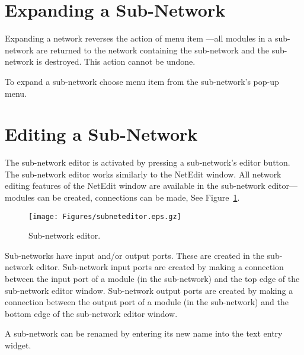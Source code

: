 \section{Expanding a Sub-Network}
\label{sec:expsubnet}

Expanding a network reverses the action of menu item ---all modules in a sub-network are returned to the
network containing the sub-network and the sub-network is destroyed.
This action cannot be undone.

To expand a sub-network choose menu item 
from the sub-network's pop-up menu.

\section{Editing a Sub-Network}
\label{sec:editsubnet}

\newcommand{\subneteditorfig}{%
  \centerline{\texttt{[image: Figures/subneteditor.eps.gz]}}
}
\begin{htmlonly}
  \newcommand{\subneteditorfig}{%
    \htmladdimg[alt="Sub-net editor"]{../Figures/subneteditor.gif}
  }
\end{htmlonly}

The sub-network editor is activated by pressing a sub-network's editor
button.  The sub-network editor works similarly to the NetEdit window.
All network editing features of the NetEdit window are available in
the sub-network editor---modules can be created, connections can be
made, \etc{} See Figure~\ref{fig:subneteditor}.

\begin{figure}[htb]
  \centering
  \begin{makeimage} \end{makeimage}
  \subneteditorfig
  \caption{\label{fig:subneteditor} Sub-network editor.}
\end{figure}

Sub-networks have input and/or output ports.  These are created in the
sub-network editor.  Sub-network input ports are created by making a
connection between the input port of a module (in the sub-network) and
the top edge of the sub-network editor window.  Sub-network output
ports are created by making a connection between the output port of a
module (in the sub-network) and the bottom edge of the sub-network
editor window.

A sub-network can be renamed by entering its new name into the
 text entry widget.

